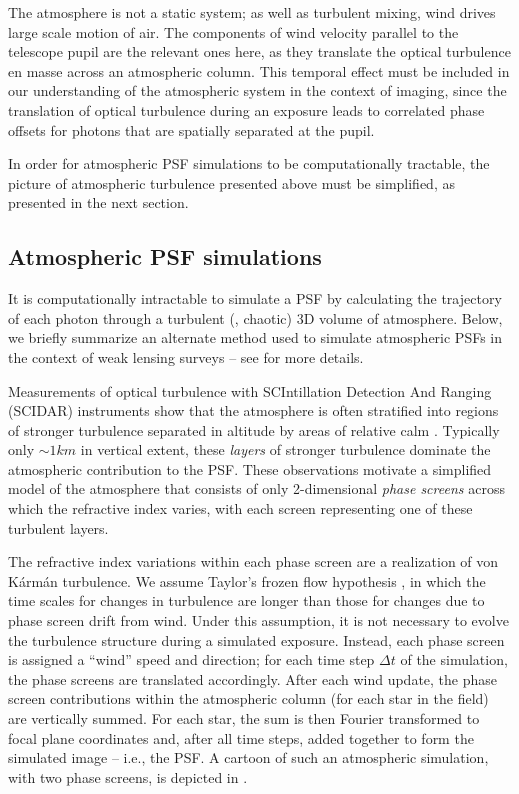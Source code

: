 \documentclass[twocolumn]{aastex631}
\newcommand{\vk}{von K\'arm\'an\xspace}
\begin{document}
The atmosphere is not a static system; as well as turbulent mixing, wind drives large scale motion of air.
The components of wind velocity parallel to the telescope pupil are the relevant ones here, as  they translate the optical turbulence en masse across an atmospheric column.
This temporal effect must be included in our understanding of the atmospheric system in the context of imaging, since the translation of optical turbulence during an exposure leads to correlated phase offsets for photons that are spatially separated at the pupil.

In order for atmospheric PSF simulations to be computationally tractable, the picture of atmospheric turbulence presented above must be simplified, as presented in the next section.

\subsection{Atmospheric PSF simulations} \label{sec:sim}
It is computationally intractable to simulate a PSF by calculating the trajectory of each photon through a turbulent (\ie, chaotic) 3D volume of atmosphere. 
Below, we briefly summarize an alternate method used to simulate atmospheric PSFs in the context of weak lensing surveys -- see \cite{jee_toward_2011, peterson_simulation_2015, lsst_dark_energy_science_collaboration_lsst_2021} for more details.

Measurements of optical turbulence with SCIntillation Detection And Ranging (SCIDAR) instruments show that the atmosphere is often stratified into regions of stronger turbulence separated in altitude by areas of relative calm  \citep{osborn_optical_2018, osborn_atmospheric_2018}.
Typically only $\sim 1\unit{km}$ in vertical extent, these \textit{layers} of stronger turbulence dominate the atmospheric contribution to the PSF. 
These observations motivate a simplified model of the atmosphere that consists of only 2-dimensional \textit{phase screens} across which the refractive index varies, with each screen representing one of these turbulent layers.

The refractive index variations within each phase screen are a realization of \vk turbulence.
We assume Taylor's frozen flow hypothesis \citep{taylor_spectrum_1938}, in which the time scales for changes in turbulence are longer than those for changes due to phase screen drift from wind. 
Under this assumption, it is not necessary to evolve the turbulence structure during a simulated exposure. 
Instead, each phase screen is assigned a ``wind'' speed and direction; for each time step $\Delta t$ of the simulation, the phase screens are translated accordingly. 
After each wind update, the phase screen contributions within the atmospheric column (for each star in the field) are vertically summed. 
For each star, the sum is then Fourier transformed to focal plane coordinates and, after all time steps, added together to form the simulated image -- i.e., the PSF.
A cartoon of such an atmospheric simulation, with two phase screens, is depicted in .
\end{document}
